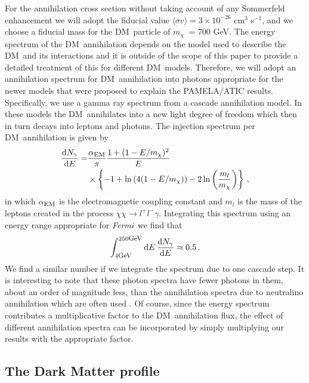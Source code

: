\documentclass[aps,prd,twocolumn,amsmath,amssymb,floatfix,nofootinbib,10pt]{revtex4}
\newcommand{\Fermi}{\emph{Fermi}}
\newcommand{\DM}{DM}
\newcommand{\mdm}{\ensuremath{m_{\chi}}}
\newcommand{\dd}{\mathrm{d}}
\newcommand{\Ngamma}{\ensuremath{N_{\gamma}}}
\newcommand{\sigmaannv}{\ensuremath{\langle\sigma v\rangle}}
\begin{document}
For the annihilation cross section without taking account of any
Sommerfeld enhancement we will adopt the fiducial value $\sigmaannv =
3 \times 10^{-26} $ cm$^3$ s$^{-1}$, and we choose a fiducial mass for
the \DM\ particle of \mdm\ = 700 GeV. The energy spectrum of the \DM\
annihilation depends on the model used to describe the \DM\ and its
interactions and it is outside of the scope of this paper to provide a
detailed treatment of this for different \DM\ models. Therefore, we
will adopt an annihilation spectrum for \DM\ annihilation into photons
appropriate for the newer models that were proposed to explain the
PAMELA/ATIC results. Specifically, we use a gamma ray spectrum from a
cascade annihilation model. In these models the \DM\ annihilates into
a new light degree of freedom which then in turn decays into leptons
and photons. The injection spectrum per \DM\ annihilation is given by
\cite{2009arXiv0901.2926M}
\begin{equation}\label{eq:annspectrum}
\begin{split}
\frac{\dd \Ngamma}{\dd E} = &\frac{\alpha_{\mbox{{\footnotesize EM}}}}{\pi} \frac{1+(1-E/\mdm)^2}{E}\\
&\times\left\{-1 + \ln\left(4(1-E/\mdm)\right) -2\ln\left(\frac{m_l}{\mdm}\right)\right\}\, ,
\end{split}
\end{equation}
in which $\alpha_{\mbox{{\footnotesize EM}}}$ is the electromagnetic
coupling constant and $m_l$ is the mass of the leptons created in the
process $\chi\chi \rightarrow l^+l^-\gamma$. Integrating this spectrum
using an energy range appropriate for \Fermi\ we find that
\begin{equation} 
\int_{4 \mbox{{\footnotesize GeV}}}^{250 \mbox{{\footnotesize GeV}}}\dd E\, \frac{\dd
\Ngamma}{\dd E} \approx 0.5\, .
\end{equation}
We find a similar number if we integrate the spectrum due to one
cascade step. It is interesting to note that these photon spectra have
fewer photons in them, about an order of magnitude less, than the
annihilation spectra due to neutralino annihilation which are often
used \cite{1998APh.....9..137B,2004PhRvD..70j3529F}. Of course, since
the energy spectrum contributes a multiplicative factor to the \DM\
annihilation flux, the effect of different annihilation spectra can be
incorporated by simply multiplying our results with the appropriate
factor.




\subsection{The Dark Matter profile}\label{sec:DMprofile}
\end{document}
